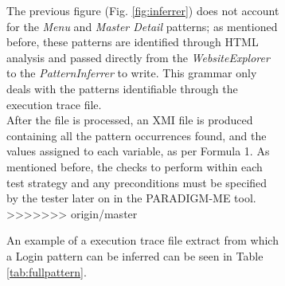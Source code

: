 \documentclass[conference]{IEEEtran}
\begin{document}
\begin{enumerate}
\begin{figure}[!htb]
\begin{itemize}
\begin{figure}[!htb]
\begin{itemize}
The previous figure (Fig. \ref{fig:inferrer}) does not account for the \textit{Menu} and \textit{Master Detail} patterns; as mentioned before, these patterns are identified through HTML analysis and passed directly from the \textit{WebsiteExplorer} to the \textit{PatternInferrer} to write. This grammar only deals with the patterns identifiable through the execution trace file.\\

After the file is processed, an XMI file is produced containing all the pattern occurrences found, and the values assigned to each variable, as per Formula 1.%
As mentioned before, the checks to perform within each test strategy and any preconditions must be specified by the tester later on in the PARADIGM-ME tool.\\
>>>>>>> origin/master

An example of a execution trace file extract from which a Login pattern can be inferred can be seen in Table \ref{tab:fullpattern}.


\end{itemize}
\end{figure}
\end{itemize}
\end{figure}
\end{enumerate}
\end{document}
